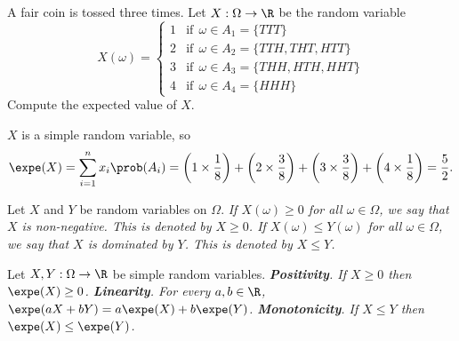 \begin{example}\label{ex:expe}
A fair coin is tossed three times. Let $X:\Omega\to\R$ be the random variable
\[
X(\omega) = \begin{cases}
1	& \text{if}\ \ \omega\in A_1=\{TTT\} \\
2	& \text{if}\ \ \omega\in A_2=\{TTH,THT,HTT\} \\
3	& \text{if}\ \ \omega\in A_3=\{THH,HTH,HHT\} \\
4	& \text{if}\ \ \omega\in A_4=\{HHH\}
\end{cases}
\]
Compute the expected value of $X$.
\end{example}

\begin{solution}
$X$ is a simple random variable, so
\[
\expe(X) 
	= \sum_{i=1}^n x_i \prob(A_i) 
	= \left(1\times\frac{1}{8}\right) +\left(2\times\frac{3}{8}\right) +\left(3\times\frac{3}{8}\right) + \left(4\times\frac{1}{8}\right)
	= \frac{5}{2}.
\]
\end{solution}



\begin{definition}
Let $X$ and $Y$ be random variables on $\Omega$.
\ben
\it If $X(\omega)\geq 0$ for all $\omega\in\Omega$, we say that $X$ is \emph{non-negative}. This is denoted by $X\geq 0$.
\it If $X(\omega)\leq Y(\omega)$ for all $\omega\in\Omega$, we say that $X$ is \emph{dominated} by $Y$. This is denoted by $X\leq Y$.
\een
\end{definition}

\vspace*{2ex}
\begin{theorem}
Let $X,Y:\Omega\to\R$ be simple random variables.%
\ben
\it \textbf{Positivity}. If $X\geq 0$ then $\expe(X)\geq 0$.
\it \textbf{Linearity}.  For every $a,b\in\R$,\ \ $\expe(aX+bY) = a\expe(X) + b\expe(Y)$.
\it \textbf{Monotonicity}. If $X\leq Y$ then $\expe(X)\leq\expe(Y)$.
\een
\end{theorem}



